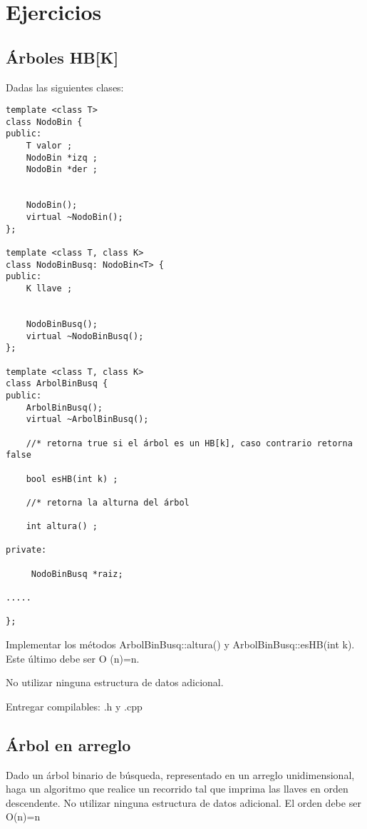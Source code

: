 \section{Ejercicios}
\label{sec:ejercicios}

\subsection{Árboles HB[K]}
\label{sec:arboles-hbk}

Dadas las siguientes clases:

\begin{verbatim}
template <class T>
class NodoBin {
public:
    T valor ;
    NodoBin *izq ;
    NodoBin *der ;


    NodoBin();
    virtual ~NodoBin();
};

template <class T, class K>
class NodoBinBusq: NodoBin<T> {
public:
    K llave ;


    NodoBinBusq();
    virtual ~NodoBinBusq();
};

template <class T, class K>
class ArbolBinBusq {
public:
    ArbolBinBusq();
    virtual ~ArbolBinBusq();

    //* retorna true si el árbol es un HB[k], caso contrario retorna false

    bool esHB(int k) ;

    //* retorna la alturna del árbol

    int altura() ;

private:

     NodoBinBusq *raiz;

.....

};
\end{verbatim}
Implementar los métodos ArbolBinBusq::altura() y
ArbolBinBusq::esHB(int k).  Este último debe ser O (n)=n.

No utilizar ninguna estructura de datos adicional.

Entregar compilables: .h y .cpp

\subsection{Árbol en arreglo}
\label{sec:arbol-en-arreglo}

Dado un árbol binario de búsqueda, representado en un arreglo
unidimensional, haga un algoritmo que realice un recorrido tal que
imprima las llaves en orden descendente.  No utilizar ninguna
estructura de datos adicional.  El orden debe ser O(n)=n

